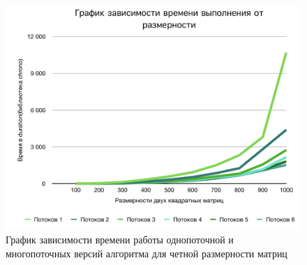 \documentclass[12pt, a4paper]{report}
\begin{document}
	\begin{figure}[ht!]
		\label{pic1}
		\includegraphics[scale=0.75]{table1}
		\caption{График зависимости времени работы однопоточной и многопоточных версий 	алгоритма для четной размерности матриц}
		\label{fig:image}
	\end{figure}

	\newpage
\end{document}
